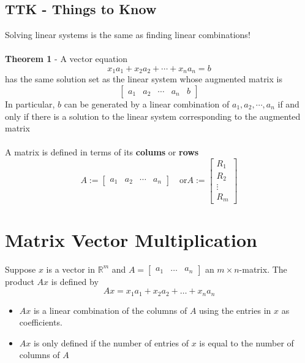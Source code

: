 \subsection{TTK - Things to Know}
Solving linear systems is the same as finding linear combinations! \\\\
\textbf{Theorem 1} - A vector equation
\[
  x_1a_1 + x_2a_2 + \cdots + x_na_n = b
\]
has the same solution set as the linear system whose augmented matrix is
\[ \left[
  \begin{array}{cccc|c}
    a_1 & a_2 & \cdots & a_n & b
  \end{array}
\right] \]
In particular, $b$ can be generated by a linear combination of $a_1, a_2, \cdots,
a_n$ if and only if there is a solution to the linear system corresponding to
the augmented matrix \\\\
A matrix is defined in terms of its \textbf{colums} or \textbf{rows}
\[
  A := \begin{bmatrix}
      a_1 & a_2 & \cdots & a_n
  \end{bmatrix} \quad \text{or}
  A := \begin{bmatrix}
      R_1 \\ R_2 \\ \vdots \\ R_m
  \end{bmatrix}
\]

\section{Matrix Vector Multiplication}
Suppose $x$ is a vector in $\mathbb{R}^m$ and $A = \begin{bmatrix}
  a_1 & \dots & a_n
\end{bmatrix}$ an $m \times n$-matrix. The product $Ax$ is defined by
\[
  Ax = x_1a_1 + x_2a_2 + \dots + x_na_n
\]
\begin{itemize}
  \item $Ax$ is a linear combination of the columns of $A$ using the entries 
    in $x$ as coefficients.
  \item $Ax$ is only defined if the number of entries of $x$ is equal to
    the number of columns of $A$
\end{itemize}

